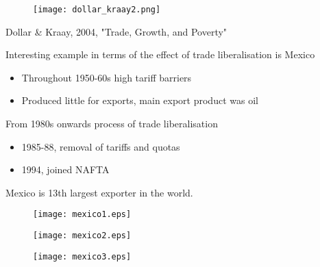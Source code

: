 \documentclass{beamer}
\begin{document}
\begin{frame}
  \begin{figure}
    \texttt{[image: dollar\_kraay2.png]}
  \end{figure}
  Dollar \& Kraay, 2004, "Trade, Growth, and Poverty"
\end{frame}

\begin{frame}
  Interesting example in terms of the effect of trade liberalisation is Mexico
  \begin{itemize}
    \item Throughout 1950-60s high tariff barriers
    \item Produced little for exports, main export product was oil
  \end{itemize}
  \medskip
  From 1980s onwards process of trade liberalisation
  \begin{itemize}
    \item 1985-88, removal of tariffs and quotas
    \item 1994, joined NAFTA
  \end{itemize}
  \medskip
  Mexico is 13th largest exporter in the world.
\end{frame}

\begin{frame}
  \begin{figure}
    \texttt{[image: mexico1.eps]}
  \end{figure}
\end{frame}

\begin{frame}
  \begin{figure}
    \texttt{[image: mexico2.eps]}
  \end{figure}
\end{frame}

\begin{frame}
  \begin{figure}
    \texttt{[image: mexico3.eps]}
  \end{figure}
\end{frame}
\end{document}

